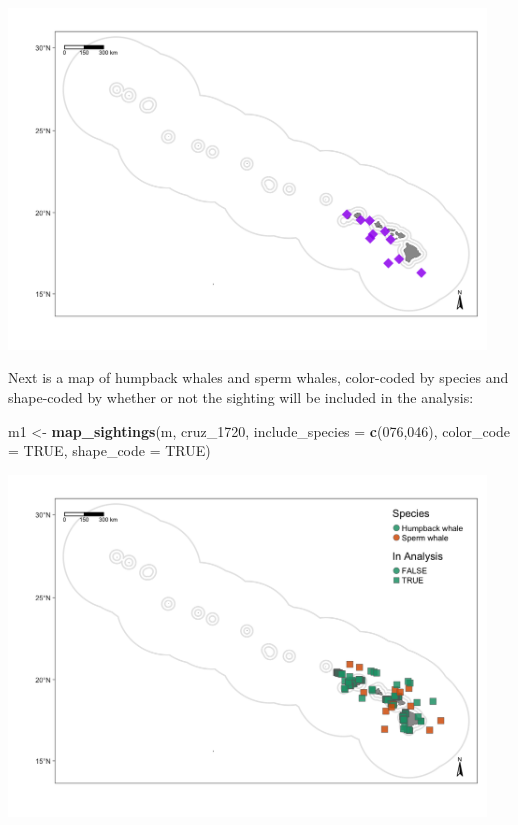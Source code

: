 \documentclass[
]{book}
\newenvironment{Shaded}{\begin{snugshade}}{\end{snugshade}}
\newcommand{\AttributeTok}[1]{\textcolor[rgb]{0.13,0.29,0.53}{#1}}
\newcommand{\ConstantTok}[1]{\textcolor[rgb]{0.56,0.35,0.01}{#1}}
\newcommand{\FunctionTok}[1]{\textcolor[rgb]{0.13,0.29,0.53}{\textbf{#1}}}
\newcommand{\NormalTok}[1]{#1}
\newcommand{\OtherTok}[1]{\textcolor[rgb]{0.56,0.35,0.01}{#1}}
\newcommand{\StringTok}[1]{\textcolor[rgb]{0.31,0.60,0.02}{#1}}
\begin{document}
\includegraphics[width=0.95\textwidth,height=\textheight]{img/map_sits2.png}

Next is a map of humpback whales and sperm whales, color-coded by species and shape-coded by whether or not the sighting will be included in the analysis:

\begin{Shaded}
\begin{Highlighting}[]
\NormalTok{m1 }\OtherTok{\textless{}{-}} \FunctionTok{map\_sightings}\NormalTok{(m, }
\NormalTok{                   cruz\_1720,}
                   \AttributeTok{include\_species =} \FunctionTok{c}\NormalTok{(}\StringTok{\textquotesingle{}076\textquotesingle{}}\NormalTok{,}\StringTok{\textquotesingle{}046\textquotesingle{}}\NormalTok{),}
                   \AttributeTok{color\_code =} \ConstantTok{TRUE}\NormalTok{,}
                   \AttributeTok{shape\_code =} \ConstantTok{TRUE}\NormalTok{)}
\end{Highlighting}
\end{Shaded}

\includegraphics[width=0.95\textwidth,height=\textheight]{img/map_sits3.png}
\end{document}
